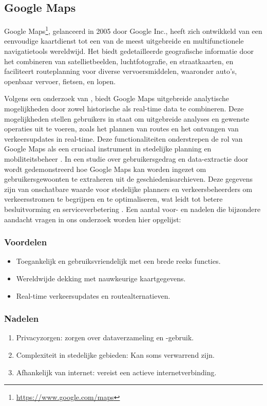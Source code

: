 \subsection{Google Maps}
Google Maps\footnote{\url{https://www.google.com/maps}}, gelanceerd in 2005 door Google Inc., heeft zich ontwikkeld van een eenvoudige kaartdienst tot een van de meest uitgebreide en multifunctionele navigatietools wereldwijd. Het biedt gedetailleerde geografische informatie door het combineren van satellietbeelden, luchtfotografie, en straatkaarten, en faciliteert routeplanning voor diverse vervoersmiddelen, waaronder auto's, openbaar vervoer, fietsen, en lopen. 

Volgens een onderzoek van \textcite{Mehta2019}, biedt Google Maps uitgebreide analytische mogelijkheden door zowel historische als real-time data te combineren. Deze mogelijkheden stellen gebruikers in staat om uitgebreide analyses en gewenste operaties uit te voeren, zoals het plannen van routes en het ontvangen van verkeersupdates in real-time. Deze functionaliteiten onderstrepen de rol van Google Maps als een cruciaal instrument in stedelijke planning en mobiliteitsbeheer \autocite{Mehta2019}. In een studie over gebruikersgedrag en data-extractie door \textcite{Sardianos2018} wordt gedemonstreerd hoe Google Maps kan worden ingezet om gebruikersgewoonten te extraheren uit de geschiedenisarchieven. Deze gegevens zijn van onschatbare waarde voor stedelijke planners en verkeersbeheerders om verkeersstromen te begrijpen en te optimaliseren, wat leidt tot betere besluitvorming en serviceverbetering \autocite{Sardianos2018}. Een aantal voor- en nadelen die bijzondere aandacht vragen in ons onderzoek worden hier opgelijst:

\subsubsection*{Voordelen}
\begin{itemize}
    \item Toegankelijk en gebruiksvriendelijk met een brede reeks functies.
    \item Wereldwijde dekking met nauwkeurige kaartgegevens.
    \item Real-time verkeersupdates en routealternatieven.
\end{itemize}
\subsubsection*{Nadelen}
\begin{enumerate}
    \item Privacyzorgen: zorgen over dataverzameling en -gebruik.
    \item Complexiteit in stedelijke gebieden: Kan soms verwarrend zijn.
    \item Afhankelijk van internet: vereist een actieve internetverbinding.
\end{enumerate}

